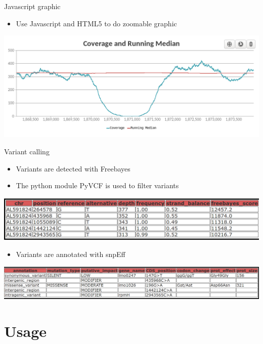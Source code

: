 \documentclass{beamer}
\begin{document}
\begin{frame}{Javascript graphic}
    \begin{itemize}
        \item Use Javascript and HTML5 to do zoomable graphic
    \end{itemize}
    \includegraphics[scale=0.28]{images/js_graphic}
\end{frame}

\begin{frame}{Variant calling}
    \begin{itemize}
        \item Variants are detected with Freebayes
        \item The python module PyVCF is used to filter variants
    \end{itemize}
    \includegraphics[scale=0.23]{images/freebayes}
    \begin{itemize}
        \item Variants are annotated with snpEff
    \end{itemize}
    \includegraphics[scale=0.18]{images/snpeff}
\end{frame}

\section{Usage}
\end{document}
